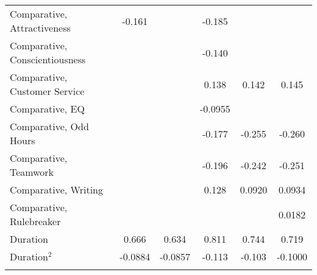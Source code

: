 {\begin{center}
{\begin{longtable}{l*{5}{c}}
            Comparative, Attractiveness      & -0.161\sym{***}       &                       & -0.185\sym{*}         &                       &                       \\
            \addlinespace
            Comparative, Conscientiousness   &                       &                       & -0.140                &                       &                       \\
            \addlinespace
            Comparative, Customer Service    &                       &                       & 0.138                 & 0.142\sym{*}          & 0.145\sym{*}          \\
            \addlinespace
            Comparative, EQ                  &                       &                       & -0.0955               &                       &                       \\
            \addlinespace
            Comparative, Odd Hours           &                       &                       & -0.177\sym{*}         & -0.255\sym{***}       & -0.260\sym{***}       \\
            \addlinespace
            Comparative, Teamwork            &                       &                       & -0.196\sym{*}         & -0.242\sym{**}        & -0.251\sym{**}        \\
            \addlinespace
            Comparative, Writing             &                       &                       & 0.128                 & 0.0920                & 0.0934                \\
            \addlinespace
            Comparative, Rulebreaker         &                       &                       &                       &                       & 0.0182                \\
            \addlinespace


            Duration                         & 0.666\sym{**}         & 0.634\sym{**}         & 0.811\sym{***}        & 0.744\sym{**}         & 0.719\sym{**}         \\
            \addlinespace
            Duration$^2$                     & -0.0884\sym{**}       & -0.0857\sym{**}       & -0.113\sym{***}       & -0.103\sym{**}        & -0.1000\sym{**}       \\
            \addlinespace



\end{longtable}}
\end{center}}
